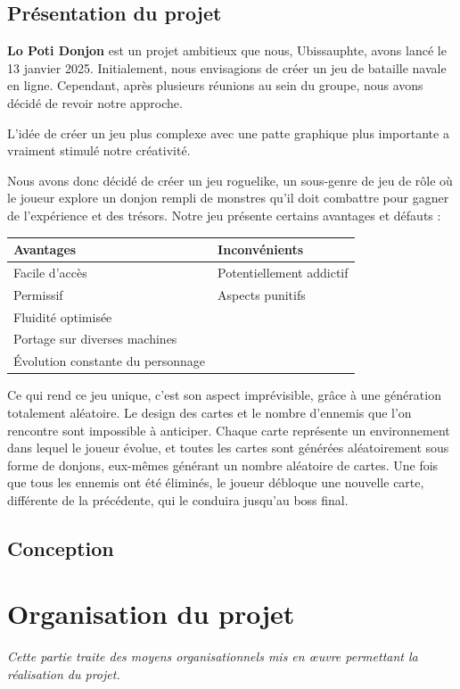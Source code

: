 \documentclass[a4paper,11pt]{article}
\begin{document}
\subsection{Présentation du projet}

\textbf{Lo Poti Donjon} est un projet ambitieux que nous, Ubissauphte, avons lancé le 13 janvier 2025. Initialement, nous envisagions de créer un jeu de bataille navale en ligne. Cependant, après plusieurs réunions au sein du groupe, nous avons décidé de revoir notre approche. 

L'idée de créer un jeu plus complexe avec une patte graphique plus importante a vraiment stimulé notre créativité.

Nous avons donc décidé de créer un jeu roguelike, un sous-genre de jeu de rôle où le joueur explore 
un donjon rempli de monstres qu'il doit combattre pour gagner de l'expérience et des trésors. Notre jeu présente certains avantages et défauts :

\begin{center}
\begin{tabular}{p{5cm}|p{5cm}}
\toprule
\textbf{Avantages} & \textbf{Inconvénients} \\
\midrule
Facile d'accès & Potentiellement addictif \\
Permissif & Aspects punitifs \\
Fluidité optimisée & \\
Portage sur diverses machines & \\
Évolution constante du personnage & \\
\bottomrule
\end{tabular}
\end{center}

Ce qui rend ce jeu unique, c'est son aspect imprévisible, grâce à une génération totalement aléatoire. Le design des cartes et le nombre d'ennemis que l'on rencontre sont impossible à anticiper. Chaque carte représente un environnement dans lequel le joueur évolue, et toutes les cartes sont générées aléatoirement sous forme de donjons, eux-mêmes générant un nombre aléatoire de cartes. Une fois que tous les ennemis ont été éliminés, le joueur débloque une nouvelle carte, différente de la précédente, qui le conduira jusqu'au boss final.

\subsection{Conception}

\section{Organisation du projet}
\textit{Cette partie traite des moyens organisationnels mis en œuvre permettant la réalisation du projet.}
\end{document}
